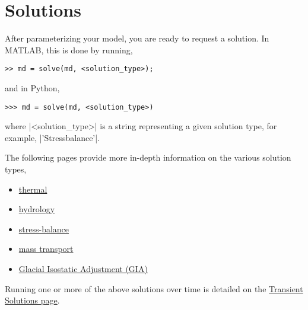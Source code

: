 
\section{Solutions} \label{sec:getting-started-solutions}
After parameterizing your model, you are ready to request a solution. In MATLAB, this is done by running,
\begin{lstlisting}
>> md = solve(md, <solution_type>);
\end{lstlisting}
and in Python,
\begin{lstlisting}
>>> md = solve(md, <solution_type>)
\end{lstlisting}
where \lstinlinebg|<solution_type>| is a string representing a given solution type, for example, \lstinlinebg|'Stressbalance'|.

The following pages provide more in-depth information on the various solution types,
\begin{itemize}
	\item \hyperref[sec:using-issm-capabilities-thermal]{thermal}
	\item \hyperref[sec:using-issm-capabilities-hydrology]{hydrology}
	\item \hyperref[sec:using-issm-capabilities-stress-balance]{stress-balance}
	\item \hyperref[sec:using-issm-capabilities-mass-transport]{mass transport}
	\item \hyperref[sec:using-issm-capabilities-gia]{Glacial Isostatic Adjustment (GIA)}
\end{itemize}

Running one or more of the above solutions over time is detailed on the 
\hyperref[sec:capabilities-transient]{Transient Solutions page}.

\clearpage %
